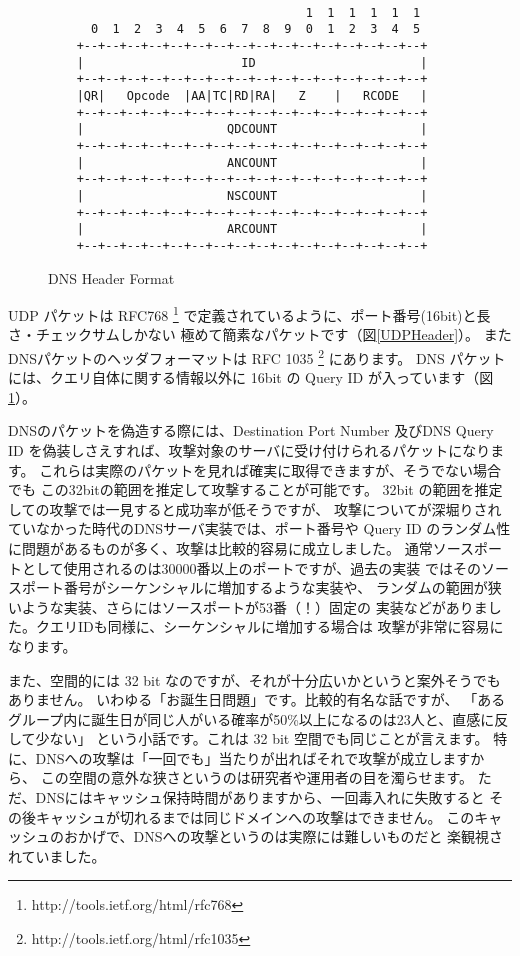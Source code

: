 \begin{figure}[hbt]
{\scriptsize
\begin{verbatim}

                                    1  1  1  1  1  1
      0  1  2  3  4  5  6  7  8  9  0  1  2  3  4  5
    +--+--+--+--+--+--+--+--+--+--+--+--+--+--+--+--+
    |                      ID                       |
    +--+--+--+--+--+--+--+--+--+--+--+--+--+--+--+--+
    |QR|   Opcode  |AA|TC|RD|RA|   Z    |   RCODE   |
    +--+--+--+--+--+--+--+--+--+--+--+--+--+--+--+--+
    |                    QDCOUNT                    |
    +--+--+--+--+--+--+--+--+--+--+--+--+--+--+--+--+
    |                    ANCOUNT                    |
    +--+--+--+--+--+--+--+--+--+--+--+--+--+--+--+--+
    |                    NSCOUNT                    |
    +--+--+--+--+--+--+--+--+--+--+--+--+--+--+--+--+
    |                    ARCOUNT                    |
    +--+--+--+--+--+--+--+--+--+--+--+--+--+--+--+--+
\end{verbatim}
}
\caption{DNS Header Format}
\label{DNSHeader}
\end{figure}


UDP パケットは RFC768 \footnote{http://tools.ietf.org/html/rfc768}
で定義されているように、ポート番号(16bit)と長さ・チェックサムしかない
極めて簡素なパケットです（図\ref{UDPHeader}）。
またDNSパケットのヘッダフォーマットは RFC 1035 \footnote{http://tools.ietf.org/html/rfc1035} 
にあります。
DNS パケットには、クエリ自体に関する情報以外に 16bit の Query ID が入っています（図\ref{DNSHeader}）。

DNSのパケットを偽造する際には、Destination Port Number 及びDNS Query
ID を偽装しさえすれば、攻撃対象のサーバに受け付けられるパケットになります。
これらは実際のパケットを見れば確実に取得できますが、そうでない場合でも
この32bitの範囲を推定して攻撃することが可能です。
32bit の範囲を推定しての攻撃では一見すると成功率が低そうですが、
攻撃についてが深堀りされていなかった時代のDNSサーバ実装では、ポート番号や
Query ID のランダム性に問題があるものが多く、攻撃は比較的容易に成立しました。
通常ソースポートとして使用されるのは30000番以上のポートですが、過去の実装
ではそのソースポート番号がシーケンシャルに増加するような実装や、
ランダムの範囲が狭いような実装、さらにはソースポートが53番（！）固定の
実装などがありました。クエリIDも同様に、シーケンシャルに増加する場合は
攻撃が非常に容易になります。

また、空間的には 32 bit なのですが、それが十分広いかというと案外そうでもありません。
いわゆる「お誕生日問題」です。比較的有名な話ですが、
「あるグループ内に誕生日が同じ人がいる確率が50\%以上になるのは23人と、直感に反して少ない」
という小話です。これは 32 bit 空間でも同じことが言えます。
特に、DNSへの攻撃は「一回でも」当たりが出ればそれで攻撃が成立しますから、
この空間の意外な狭さというのは研究者や運用者の目を濁らせます。
ただ、DNSにはキャッシュ保持時間がありますから、一回毒入れに失敗すると
その後キャッシュが切れるまでは同じドメインへの攻撃はできません。
このキャッシュのおかげで、DNSへの攻撃というのは実際には難しいものだと
楽観視されていました。

